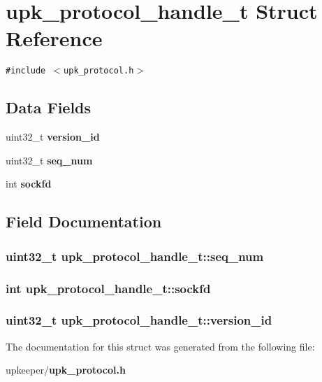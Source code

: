 \section{upk\_\-protocol\_\-handle\_\-t Struct Reference}
\label{structupk__protocol__handle__t}
{\tt \#include $<$upk\_\-protocol.h$>$}

\subsection*{Data Fields}
\begin{CompactItemize}
\item 
uint32\_\-t \bf{version\_\-id}
\item 
uint32\_\-t \bf{seq\_\-num}
\item 
int \bf{sockfd}
\end{CompactItemize}


\subsection{Field Documentation}
\subsubsection{\setlength{\rightskip}{0pt plus 5cm}uint32\_\-t \bf{upk\_\-protocol\_\-handle\_\-t::seq\_\-num}}\label{structupk__protocol__handle__t_f0b2c3b97c527ad785cc9988bde02e60}


\subsubsection{\setlength{\rightskip}{0pt plus 5cm}int \bf{upk\_\-protocol\_\-handle\_\-t::sockfd}}\label{structupk__protocol__handle__t_4a4754101f394c51677493fc595edd74}


\subsubsection{\setlength{\rightskip}{0pt plus 5cm}uint32\_\-t \bf{upk\_\-protocol\_\-handle\_\-t::version\_\-id}}\label{structupk__protocol__handle__t_b59f92281f04c6af2b85c67993757fc1}




The documentation for this struct was generated from the following file:\begin{CompactItemize}
\item 
upkeeper/\bf{upk\_\-protocol.h}\end{CompactItemize}
